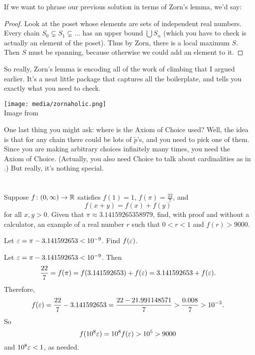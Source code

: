 If we want to phrase our previous solution in terms of Zorn's lemma, we'd say:
\begin{proof}
	Look at the poset whose elements are sets of independent real numbers.
	Every chain $S_0 \subsetneq S_1 \subsetneq \dots$ has an upper bound $\bigcup S_\alpha$
	(which you have to check is actually an element of the poset).
	Thus by Zorn, there is a local maximum $S$.
	Then $S$ must be spanning, because otherwise we could add an element to it.
\end{proof}
So really, Zorn's lemma is encoding all of the work of climbing that I argued earlier.
It's a neat little package that captures all the boilerplate, and tells
you exactly what you need to check.

\begin{center}
	\texttt{[image: media/zornaholic.png]}
	\\ \scriptsize Image from \cite{img:zornaholic}
\end{center}

One last thing you might ask:
where is the Axiom of Choice used?
Well, the idea is that for any chain there could be lots of $\tilde p$'s,
and you need to pick one of them.
Since you are making arbitrary choices infinitely many times, you need the Axiom of Choice.
(Actually, you also need Choice to talk about cardinalities as in
.)
But really, it's nothing special.

\section{\problemhead}
\begin{problem}
	Suppose $f \colon (0,\infty) \to \mathbb R$ satisfies
	$f(1)=1$, $f(\pi) = \frac{22}{7}$, and
	\[ f(x+y) = f(x) + f(y) \]
	for all $x,y > 0$.
	Given that $\pi \approx 3.14159265358979$,
	find, with proof and without a calculator,
	an example of a real number $r$ such that $0 < r < 1$ and $f(r) > 9000$.
	\begin{hint}
		Let $\varepsilon = \pi - 3.141592653 < 10^{-9}$. Find $f(\varepsilon)$.
	\end{hint}
	\begin{sol}
		Let $\varepsilon = \pi - 3.141592653 < 10^{-9}$.
		Then
		\[ \frac{22}{7} = f(\pi) = f(3.141592653) + f(\varepsilon) = 3.141592653 + f(\varepsilon). \]
		Therefore,
		\[ f(\varepsilon) = \frac{22}{7} - 3.141592653
			= \frac{22 - 21.991148571}{7} > \frac{0.008}{7} > 10^{-3}. \]
		So
		\[ f(10^8 \varepsilon) = 10^8 f(\varepsilon) > 10^5 > 9000 \]
		and $10^8 \varepsilon < 1$, as needed.
	\end{sol}
\end{problem}

